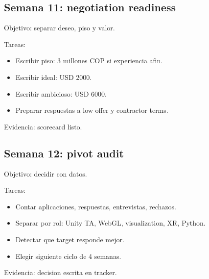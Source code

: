 \subsection{Semana 11: negotiation readiness}


Objetivo: separar deseo, piso y valor.


Tareas:


\begin{itemize}
\item Escribir piso: 3 millones COP si experiencia afin.
\item Escribir ideal: USD 2000.
\item Escribir ambicioso: USD 6000.
\item Preparar respuestas a low offer y contractor terms.
\end{itemize}


Evidencia: scorecard listo.


\subsection{Semana 12: pivot audit}


Objetivo: decidir con datos.


Tareas:


\begin{itemize}
\item Contar aplicaciones, respuestas, entrevistas, rechazos.
\item Separar por rol: Unity TA, WebGL, visualization, XR, Python.
\item Detectar que target responde mejor.
\item Elegir siguiente ciclo de 4 semanas.
\end{itemize}


Evidencia: decision escrita en tracker.
